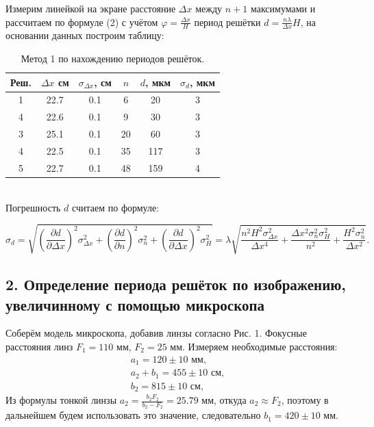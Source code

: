 \documentclass[a4paper, 12pt]{article}%
\begin{document}
Измерим линейкой на экране расстояние $\Delta x$ между $n+1$ максимумами и рассчитаем по формуле (2) с учётом $\varphi = \frac{\Delta x}{H}$ период решётки $d = \frac{n \lambda}{\Delta x}H$, на основании данных построим таблицу:
\begin{table}[h]
\begin{tabular}{|c|c|c|c|c|c|}
\hline
Реш. & $\Delta x$ см & $\sigma_{\Delta x}$, см & $n$  & $d$, мкм & $\sigma_d$, мкм \\ \hline
1     & 22.7         & 0.1                   & 6  & 20 & 3        \\ \hline
4     & 22.6         & 0.1                   & 9  & 30 & 3        \\ \hline
3     & 25.1         & 0.1                   & 20 & 60 & 3        \\ \hline
4     & 22.5         & 0.1                   & 35 & 117 & 3 	\\ \hline
5     & 22.7         & 0.1                   & 48 & 159 & 4        \\ \hline
\end{tabular}
\centering
\caption{Метод 1 по нахождению периодов решёток.}
\end{table}\\
Погрешность $d$ считаем по формуле:
\textbf{       }

$$
\sigma_{d} = \sqrt{\left(\dfrac{\partial d}{\partial \Delta x}\right)^2 \sigma^2_{\Delta x} + \left(\dfrac{\partial d}{\partial n}\right)^2 \sigma^2_{n} + \left(\dfrac{\partial d}{\partial \Delta x}\right)^2 \sigma^2_{H}} =\lambda \sqrt{\dfrac{n^2 H^2 \sigma^2_{\Delta x}}{\Delta x^4} + \dfrac{\Delta x^2 \sigma^2_{n} \sigma^2_{H}}{n^2} + \dfrac{H^2 \sigma^2_{n}}{\Delta x^2}}.
$$

\textbf{       }

\subsection*{2. Определение периода решёток по изображению, увеличинному с помощью микроскопа}
Соберём модель микроскопа, добавив линзы согласно Рис. 1. Фокусные расстояния линз $F_1 = 110 \text{ мм}$, $F_2 = 25 \text{ мм}$. Измеряем необходимые расстояния:
$$
\begin{array}{r}
a_1 = 120 \pm 10 \text{ мм},\\
a_2 + b_1 = 455 \pm 10 \text{  см},\\
b_2 = 815 \pm 10 \text{ см},
\end{array}
$$
Из формулы тонкой линзы $a_2 = \frac{b_2 F_2}{b_2 - F_2} = 25.79 \text{ мм}$, откуда $a_2 \approx F_2$, поэтому в дальнейшем будем использовать это значение, следовательно $b_1 = 420 \pm 10 \text{ мм}$. \\
\textbf{       }
\end{document}
